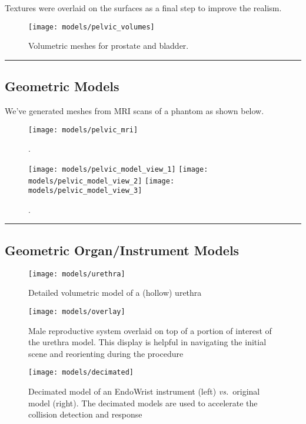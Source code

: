 Textures were overlaid on the surfaces as a final step to improve the realism.

\begin{figure}
  \centering%
  \texttt{[image: models/pelvic\_volumes]}
  \caption{Volumetric meshes for prostate and bladder.}\label{fig:organ_prostate_bladder_generation}
\end{figure}

\hrule%

\subsection{Geometric Models}\label{geometric_models}
We've generated meshes from MRI scans of a phantom as shown below.

\begin{figure}
  \centering%
	\texttt{[image: models/pelvic\_mri]}\\[10ex]
	\caption{.}\label{fig:pelvic_osirix}
\end{figure}
\begin{figure}
  \centering%
	\texttt{[image: models/pelvic\_model\_view\_1]}\hfill%
	\texttt{[image: models/pelvic\_model\_view\_2]}\hfill%
	\texttt{[image: models/pelvic\_model\_view\_3]}
	\caption{.}\label{fig:pelvic_models}
\end{figure}

\hrule%

\subsection{Geometric Organ/Instrument Models}
\begin{figure}
  \centering%
  \texttt{[image: models/urethra]}
  \caption{Detailed volumetric model of a (hollow) urethra}\label{fig:urethra}
\end{figure}

\begin{figure}
  \centering%
  \texttt{[image: models/overlay]}
  \caption{Male reproductive system overlaid on top of a portion of interest of the urethra model. This display is helpful in navigating the initial scene and reorienting during the procedure}\label{fig:overlay}
\end{figure}

\begin{figure}
  \centering%
  \texttt{[image: models/decimated]}
  \caption{Decimated model of an EndoWrist instrument (left) \emph{vs.}\ original model (right). The decimated models are used to accelerate the collision detection and response}\label{fig:decimated}
\end{figure}

